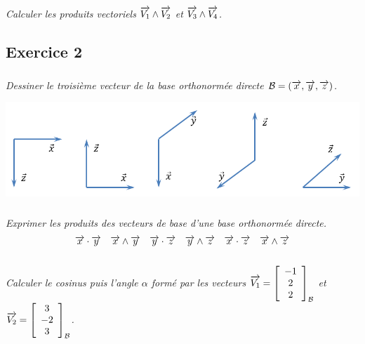 \documentclass[11pt,oneside]{article}
\begin{document}
\subparagraph{}
\textit{Calculer les produits vectoriels $\overrightarrow{V_1}\wedge \overrightarrow{V_2}$ et  $\overrightarrow{V_3}\wedge \overrightarrow{V_4}$.}



\subsection*{Exercice 2}
\setcounter{subparagraph}{0}
\subparagraph{}
\textit{Dessiner le troisième vecteur de la base orthonormée directe $\mathcal{B}=\left(\overrightarrow{x},\overrightarrow{y},\overrightarrow{z}\right)$.}


\begin{center}
\includegraphics[width=.9\textwidth]{png/exo2}
\end{center}
\subparagraph{}
\textit{Exprimer les produits des vecteurs de base d'une base orthonormée directe.}
$$
\overrightarrow{x}\cdot\overrightarrow{y}
\quad
\overrightarrow{x}\wedge\overrightarrow{y}
\quad
\overrightarrow{y}\cdot\overrightarrow{z}
\quad
\overrightarrow{y}\wedge\overrightarrow{z}
\quad
\overrightarrow{x}\cdot\overrightarrow{z}
\quad
\overrightarrow{x}\wedge\overrightarrow{z}
$$


\subparagraph{}
\textit{Calculer le cosinus puis l'angle $\alpha$ formé par les vecteurs $\overrightarrow{V_1}=\left[\begin{array}{c}-1\\2\\2\end{array}\right]_{\mathcal{B}}$ et 
$\overrightarrow{V_2}=\left[\begin{array}{c}3\\-2\\3\end{array}\right]_{\mathcal{B}}$.}

\end{document}
